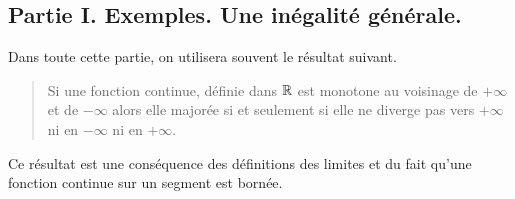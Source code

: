 \subsection*{Partie I. Exemples. Une inégalité générale.}

Dans toute cette partie, on utilisera souvent le r\'{e}sultat suivant.

\begin{quote}
Si une fonction continue, d\'{e}finie dans $\mathbb{R}$ est monotone au
voisinage de $+\infty $ et de $-\infty $ alors elle major\'{e}e si et
seulement si elle ne diverge pas vers $+\infty $ ni en $-\infty $ ni en $+\infty $.
\end{quote}

Ce r\'{e}sultat est une cons\'{e}quence des d\'{e}finitions des limites et du fait qu'une fonction continue sur un segment est born\'{e}e$.$

